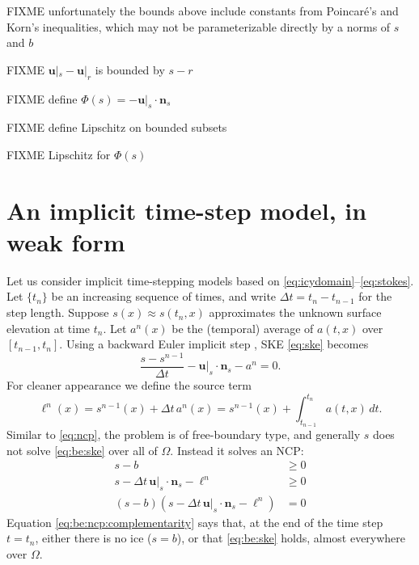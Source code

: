 \documentclass[hidelinks,onefignum,onetabnum,final]{siamart220329}  %
\newcommand{\bn}{\mathbf{n}}
\newcommand{\bu}{\mathbf{u}}
\begin{document}
FIXME unfortunately the bounds above include constants from Poincar\'e's and Korn's inequalities, which may not be parameterizable directly by a norms of $s$ and $b$

\begin{conjecture} \label{conj:a}
FIXME $\bu|_s - \bu|_r$ is bounded by $s-r$
\end{conjecture}

FIXME define $\Phi(s) = -\bu|_s\cdot \bn_s$

FIXME define Lipschitz on bounded subsets

\begin{lemma} \label{lem:philipschitz}
FIXME Lipschitz for $\Phi(s)$
\end{lemma}


\section{An implicit time-step model, in weak form} \label{sec:model}

Let us consider implicit time-stepping models based on \eqref{eq:icydomain}--\eqref{eq:stokes}.  Let $\{t_n\}$ be an increasing sequence of times, and write $\Delta t = t_n-t_{n-1}$ for the step length.  Suppose $s(x)\approx s(t_n,x)$ approximates the unknown surface elevation at time $t_n$.  Let $a^n(x)$ be the (temporal) average of $a(t,x)$ over $[t_{n-1},t_n]$.  Using a backward Euler implicit step \cite{AscherPetzold1998}, SKE \eqref{eq:ske} becomes
\begin{equation}
\frac{s - s^{n-1}}{\Delta t} - \bu|_{s} \cdot \bn_{s} - a^n = 0. \label{eq:be:ske}
\end{equation}
For cleaner appearance we define the source term
\begin{equation}
\ell^n(x) = s^{n-1}(x)+\Delta t\,a^n(x) = s^{n-1}(x) + \int_{t_{n-1}}^{t_n} a(t,x)\,dt. \label{eq:be:source}
\end{equation}
Similar to \eqref{eq:ncp}, the problem is of free-boundary type, and generally $s$ does not solve \eqref{eq:be:ske} over all of $\Omega$.  Instead it solves an NCP:
\begin{subequations}
\label{eq:be:ncp}
\begin{align}
s - b &\ge 0 \label{eq:be:ncp:constraint} \\
s - \Delta t\,\bu|_s \cdot \bn_s - \ell^n &\ge 0 \\
(s - b) \left(s - \Delta t\,\bu|_s \cdot \bn_s - \ell^n\right) &= 0 \label{eq:be:ncp:complementarity}
\end{align}
\end{subequations}
Equation \eqref{eq:be:ncp:complementarity} says that, at the end of the time step $t=t_n$, either there is no ice ($s=b$), or that \eqref{eq:be:ske} holds, almost everywhere over $\Omega$.
\end{document}
